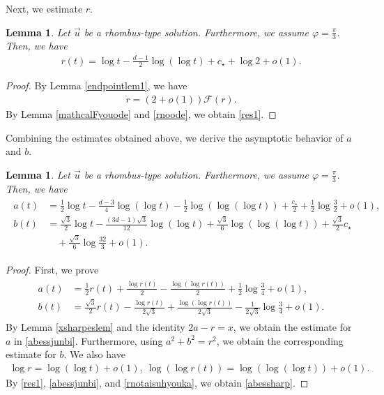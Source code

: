\documentclass[reqno]{amsart}
\theoremstyle{plain}
\newtheorem{lemma}[theorem]{Lemma}
\theoremstyle{definition}
\numberwithin{equation}{section}
\begin{document}
Next, we estimate $r$.



\begin{lemma}\label{reslem}
Let $\vec{u}$ be a rhombus-type solution. Furthermore, we assume $\varphi=\frac{\pi}{3}$. Then, we have
\begin{align}\label{res1}
r(t)=\log{t}-\frac{d-1}{2}\log{(\log{t})}+c_{\star}+\log{2}+o(1).
\end{align}
\end{lemma}
\begin{proof}
By Lemma \ref{endpointlem1}, we have
\begin{align}\label{rnoode}
\dot{r}=\left(2+o(1)\right)\mathcal{F}(r).
\end{align}
By Lemma \ref{mathcalFyouode} and \eqref{rnoode}, we obtain \eqref{res1}.
\end{proof}


Combining the estimates obtained above, we derive the asymptotic behavior of $a$ and $b$.

\begin{lemma}\label{abes}
Let $\vec{u}$ be a rhombus-type solution. Furthermore, we assume $\varphi=\frac{\pi}{3}$. Then, we have
\begin{align}\label{abessharp}
\begin{aligned}
a(t)&=\frac{1}{2}\log{t}-\frac{d-3}{4}\log{(\log{t})}-\frac{1}{2}\log{(\log{(\log{t})})}+\frac{c_{\star}}{2}+\frac{1}{2}\log{\frac{3}{2}}+o(1),
\\
b(t)&=\frac{\sqrt{3}}{2}\log{t}-\frac{(3d-1)\sqrt{3}}{12}\log{(\log{t})}+\frac{\sqrt{3}}{6}\log{(\log{(\log{t})})}+\frac{\sqrt{3}}{2}c_{\star}
\\
&\quad+\frac{\sqrt{3}}{6}\log{\frac{32}{3}}+o(1).
\end{aligned}
\end{align}
\end{lemma}
\begin{proof}
First, we prove
\begin{align}\label{abessjunbi}
\begin{aligned}
a(t)&=\frac{1}{2}r(t)+\frac{\log{r(t)}}{2}-\frac{\log{(\log{r(t)})}}{2}+\frac{1}{2}\log{\frac{3}{4}}+o(1),
\\
b(t)&=\frac{\sqrt{3}}{2}r(t)-\frac{\log{r(t)}}{2\sqrt{3}}+\frac{\log{(\log{r(t)})}}{2\sqrt{3}}-\frac{1}{2\sqrt{3}}\log{\frac{3}{4}}+o(1).
\end{aligned}
\end{align}
By Lemma \ref{xsharpeslem} and the identity $2a-r=x$, we obtain the estimate for $a$ in \eqref{abessjunbi}. Furthermore, using $a^2+b^2=r^2$, we obtain the corresponding estimate for $b$. We also have
\begin{align}\label{rnotaisuhyouka}
\log{r}=\log{(\log{t})}+o(1),\ \log{(\log{r(t)})}=\log{(\log{(\log{t})})}+o(1).
\end{align}
By \eqref{res1}, \eqref{abessjunbi}, and \eqref{rnotaisuhyouka}, we obtain \eqref{abessharp}.

\end{proof}
\end{document}
